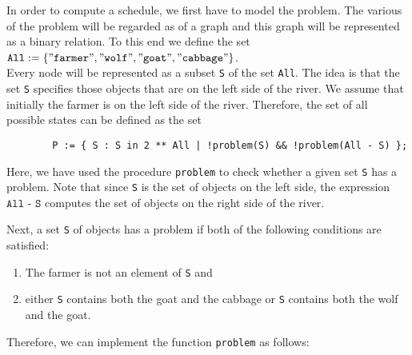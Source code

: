 \noindent
In order to compute a schedule, we first have to model the problem.  The various  of the problem will
be regarded as  of a graph and this graph will be represented as a binary relation.
To this end we define the set
\\[0.2cm]
\hspace*{1.3cm} 
$\texttt{All} := \{ \squote{farmer}, \squote{wolf}, \squote{goat},\squote{cabbage} \}$.
\\[0.2cm]
Every node will be represented as a subset \texttt{S} of the set \texttt{All}.  The idea is that the set \texttt{S}
specifies those objects that are on the left side of the river.  We assume that initially the farmer
is on the left side of the river. 
Therefore, the set of all possible states can be defined as the set
\begin{verbatim}
        P := { S : S in 2 ** All | !problem(S) && !problem(All - S) };
\end{verbatim}
Here, we have used the procedure \texttt{problem} to check whether a given set \texttt{S} has a problem. 
Note that since \texttt{S} is the set of objects on the left side, the expression $\texttt{All - S}$
computes the set of objects on the right side of the river.

Next, a set \texttt{S} of objects has a problem if both of the following conditions
are satisfied:
\begin{enumerate}
\item The farmer is not an element of \texttt{S} and
\item either \texttt{S} contains both the goat and the cabbage or \texttt{S} contains both the wolf and the goat.
\end{enumerate}
Therefore, we can implement the function \texttt{problem} as follows:


